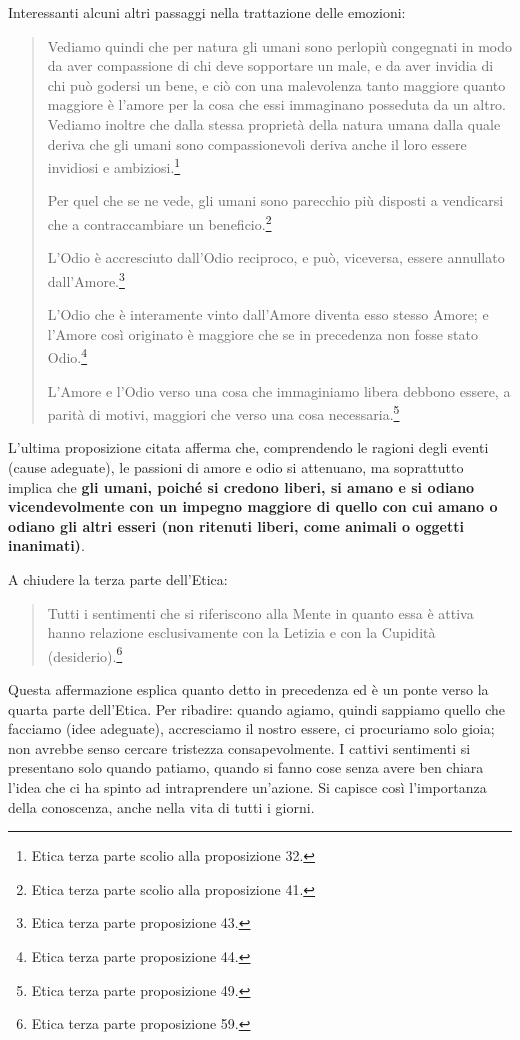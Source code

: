 Interessanti alcuni altri passaggi nella trattazione delle emozioni:

\begin{quotation}
	\small Vediamo quindi che per natura gli umani sono perlopiù congegnati in modo da aver compassione di chi deve sopportare un male, e da aver invidia di chi può godersi
	un bene, e ciò con una malevolenza tanto maggiore quanto maggiore è
	l’amore per la cosa che essi immaginano posseduta da un altro. Vediamo inoltre che dalla
	stessa proprietà della natura umana dalla quale deriva che gli umani sono compassionevoli
	deriva anche il loro essere invidiosi e ambiziosi.\footnote{Etica terza parte scolio alla proposizione 32.}
	
 Per quel che se ne vede, gli umani
	sono parecchio più disposti a vendicarsi che a contraccambiare un beneficio.\footnote{Etica terza parte scolio alla proposizione 41.}
	
	L’Odio è accresciuto dall’Odio reciproco, e può, viceversa, essere annullato dall’Amore.\footnote{Etica terza parte proposizione 43.}
	
	L’Odio che è interamente vinto dall’Amore diventa esso stesso Amore; e l’Amore così originato è maggiore che se in precedenza non fosse stato Odio.\footnote{Etica terza parte proposizione 44.}
	
	L’Amore e l’Odio verso una cosa che immaginiamo libera debbono essere, a parità di motivi, maggiori che verso una cosa necessaria.\footnote{Etica terza parte proposizione 49.}
\end{quotation}

L'ultima proposizione citata afferma che, comprendendo le ragioni degli eventi (cause adeguate), le passioni di amore e odio si attenuano, ma soprattutto implica che \textbf{gli umani, poiché si credono liberi, si amano e si odiano vicendevolmente con un impegno maggiore di quello con cui amano o odiano gli altri esseri (non ritenuti liberi, come animali o oggetti inanimati)}.

A chiudere la terza parte dell'Etica:

\begin{quotation}
	\small Tutti i sentimenti che si riferiscono alla Mente in quanto essa è attiva hanno relazione
	esclusivamente con la Letizia e con la Cupidità (desiderio).\footnote{Etica terza parte proposizione 59.}
\end{quotation}

Questa affermazione esplica quanto detto in precedenza ed è un ponte verso la quarta parte dell'Etica. Per ribadire: quando agiamo, quindi sappiamo quello che facciamo (idee adeguate), accresciamo il nostro essere, ci procuriamo solo gioia; non avrebbe senso cercare tristezza consapevolmente. I cattivi sentimenti si presentano solo quando patiamo, quando si fanno cose senza avere ben chiara l'idea che ci ha spinto ad intraprendere un'azione. Si capisce così l'importanza della conoscenza, anche nella vita di tutti i giorni.


